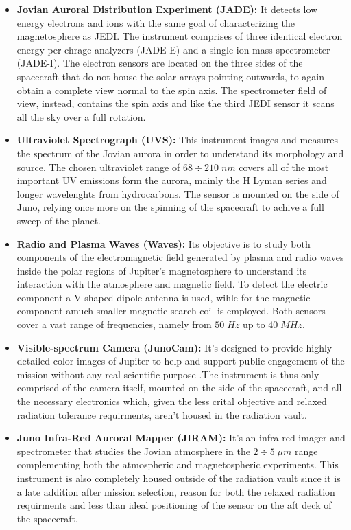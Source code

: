 \begin{itemize}
    \item \textbf{Jovian Auroral Distribution Experiment (JADE):} It detects low energy electrons and ions with the same goal of characterizing the magnetosphere as JEDI. The instrument comprises of three identical electron energy per chrage analyzers (JADE-E) and a single ion mass spectrometer (JADE-I). The electron sensors are located on the three sides of the  spacecraft that do not house the solar arrays pointing outwards, to again obtain a complete view normal to the spin axis. The spectrometer field of view, instead, contains the spin axis and like the third JEDI sensor it scans all the sky over a full rotation.
    
    \item \textbf{Ultraviolet Spectrograph (UVS):} This instrument images and measures the spectrum of the Jovian aurora in order to understand its morphology and source. The chosen ultraviolet range of $68 \div 210 \;nm$ covers all of the most important UV emissions form the aurora, mainly the H Lyman series and longer wavelenghts from hydrocarbons. The sensor is mounted on the side of Juno, relying once more on the spinning of the spacecraft to achive a full sweep of the planet. 
    
    \item \textbf{Radio and Plasma Waves (Waves):} Its objective is to study both components of the electromagnetic field generated by plasma and radio waves inside the polar regions of Jupiter's magnetosphere to understand its interaction with the atmosphere and magnetic field. To detect the electric component a V-shaped dipole antenna is used, wihle for the magnetic component amuch smaller magnetic search coil is employed. Both sensors cover a vast range of frequencies, namely from $50 \;Hz$ up to $40 \;MHz$.

    \item \textbf{Visible-spectrum Camera (JunoCam):} It's designed to provide highly detailed color images of Jupiter to help and support public engagement of the mission without any real scientific purpose .The instrument is thus only comprised of the camera itself, mounted on the side of the spacecraft, and all the necessary electronics which, given the less crital objective and relaxed radiation tolerance requirments, aren't housed in the radiation vault.

    \item \textbf{Juno Infra-Red Auroral Mapper (JIRAM):} It's an infra-red imager and spectrometer that studies the Jovian atmosphere in the \(2 \div 5 \;\mu m\) range complementing both the atmospheric and magnetospheric experiments. This instrument is also completely housed outside of the radiation vault since it is a late addition after mission selection, reason for both the relaxed radiation requirments and less than ideal positioning of the sensor on the aft deck of the spacecraft.
       
\end{itemize}

